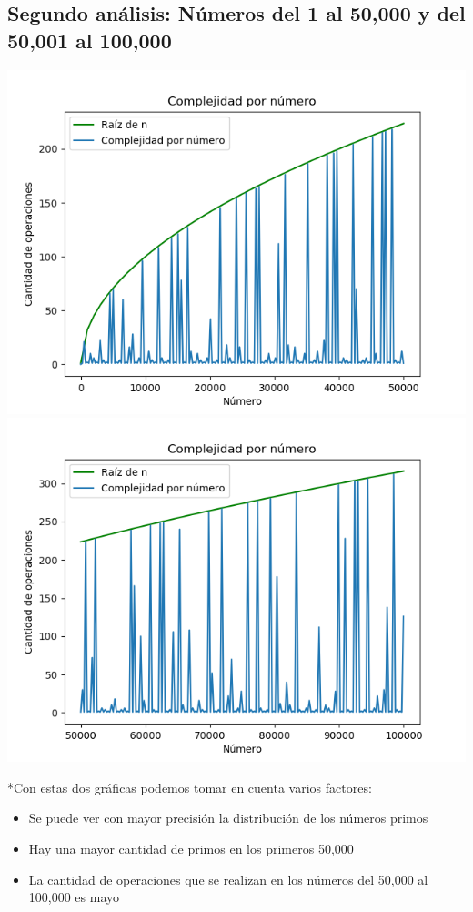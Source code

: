 \subsection{Segundo an\'alisis: N\'umeros del 1 al 50,000 y del 50,001 al 100,000}
\begin{center}
	\includegraphics[scale=0.5]{Numeros1al50000.png}
    \includegraphics[scale=0.5]{Numeros50000al100000.png}
\end{center}
*Con estas dos gr\'aficas podemos tomar en cuenta varios factores:
\begin{itemize}
\item Se puede ver con mayor precisi\'on la distribuci\'on de los n\'umeros primos
\item Hay una mayor cantidad de primos en los primeros 50,000
\item La cantidad de operaciones que se realizan en los n\'umeros del 50,000 al 100,000 es mayo
\end{itemize}


